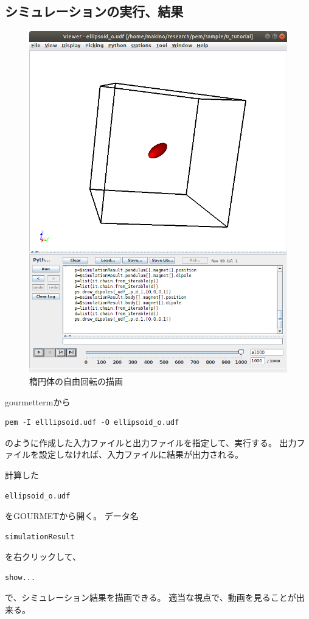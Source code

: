 \documentclass[a4paper,11pt]{jarticle}
\begin{document}
\subsection{シミュレーションの実行、結果}
\begin{figure}[h]
\centering
  \includegraphics[clip,width=0.7\linewidth]{ellipsoid.png}
  \caption{楕円体の自由回転の描画
  }
  \label{fig:ellipsoid}
\end{figure}
gourmettermから
\begin{verbatim}
pem -I elllipsoid.udf -O ellipsoid_o.udf
\end{verbatim}
のように作成した入力ファイルと出力ファイルを指定して、実行する。
出力ファイルを設定しなければ、入力ファイルに結果が出力される。

計算した
\begin{verbatim}
ellipsoid_o.udf
\end{verbatim}
をGOURMETから開く。
データ名
\begin{verbatim}
simulationResult
\end{verbatim}
を右クリックして、
\begin{verbatim}
show...
\end{verbatim}
で、シミュレーション結果を描画できる。
適当な視点で、動画を見ることが出来る。
\end{document}

